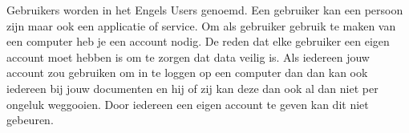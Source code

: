 Gebruikers worden in het Engels Users genoemd. Een gebruiker kan een persoon zijn maar ook een applicatie of service. Om als gebruiker gebruik te maken van een computer heb je een account nodig. De reden dat elke gebruiker een eigen account moet hebben is om te zorgen dat data veilig is. Als iedereen jouw account zou gebruiken om in te loggen op een computer dan dan kan ook iedereen bij jouw documenten en hij of zij kan deze dan ook al dan niet per ongeluk weggooien. Door iedereen een eigen account te geven kan dit niet gebeuren.

